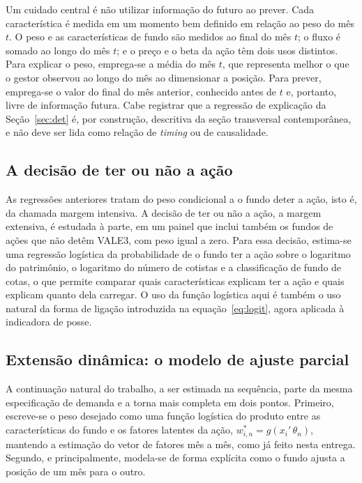 \documentclass[12pt,a4paper]{article}
\begin{document}
Um cuidado central é não utilizar informação do futuro ao prever. Cada característica é medida em
um momento bem definido em relação ao peso do mês $t$. O peso e as características de fundo são
medidos ao final do mês $t$; o fluxo é somado ao longo do mês $t$; e o preço e o beta da ação têm
dois usos distintos. Para explicar o peso, emprega-se a média do mês $t$, que representa melhor o
que o gestor observou ao longo do mês ao dimensionar a posição. Para prever, emprega-se o valor
do final do mês anterior, conhecido antes de $t$ e, portanto, livre de informação futura. Cabe
registrar que a regressão de explicação da Seção~\ref{sec:det} é, por construção, descritiva da
seção transversal contemporânea, e não deve ser lida como relação de \emph{timing} ou de
causalidade.

\subsection{A decisão de ter ou não a ação}
\label{sec:ext}

As regressões anteriores tratam do peso condicional a o fundo deter a ação, isto é, da chamada
margem intensiva. A decisão de ter ou não a ação, a margem extensiva, é estudada à parte, em um
painel que inclui também os fundos de ações que não detêm VALE3, com peso igual a zero. Para essa
decisão, estima-se uma regressão logística da probabilidade de o fundo ter a ação sobre o
logaritmo do patrimônio, o logaritmo do número de cotistas e a classificação de fundo de cotas, o
que permite comparar quais características explicam ter a ação e quais explicam quanto dela
carregar. O uso da função logística aqui é também o uso natural da forma de ligação introduzida na
equação~\eqref{eq:logit}, agora aplicada à indicadora de posse.

\subsection{Extensão dinâmica: o modelo de ajuste parcial}
\label{sec:pa}

A continuação natural do trabalho, a ser estimada na sequência, parte da mesma especificação de
demanda e a torna mais completa em dois pontos. Primeiro, escreve-se o peso desejado como uma
função logística do produto entre as características do fundo e os fatores latentes da ação,
$w_{i,n}^{*} = g(x_i'\,\theta_n)$, mantendo a estimação do vetor de fatores mês a mês, como já
feito nesta entrega. Segundo, e principalmente, modela-se de forma explícita como o fundo ajusta
a posição de um mês para o outro.
\end{document}

